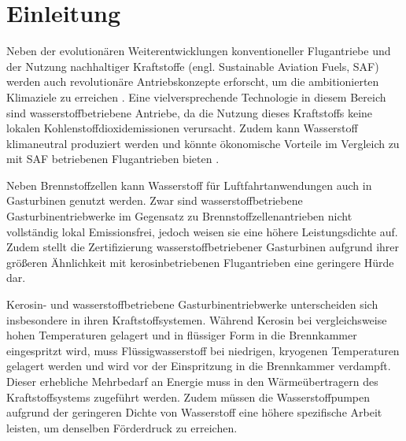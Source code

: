 \chapter{Einleitung}\label{chap:einleitung}



Neben der evolutionären Weiterentwicklungen konventioneller Flugantriebe und der Nutzung nachhaltiger Kraftstoffe (engl. Sustainable Aviation Fuels, SAF) werden auch revolutionäre Antriebskonzepte erforscht, um die ambitionierten Klimaziele zu erreichen \cite{cleanskies, EuropeanCommission2011}. Eine vielversprechende Technologie in diesem Bereich sind wasserstoffbetriebene Antriebe, da die Nutzung dieses Kraftstoffs keine lokalen Kohlenstoffdioxidemissionen verursacht. Zudem kann Wasserstoff klimaneutral produziert werden und könnte  ökonomische Vorteile im Vergleich zu mit SAF betriebenen Flugantrieben bieten \cite{VanLandingham}.

Neben Brennstoffzellen kann Wasserstoff für Luftfahrtanwendungen auch in Gasturbinen genutzt werden. Zwar sind wasserstoffbetriebene Gasturbinentriebwerke im Gegensatz zu Brennstoffzellenantrieben nicht vollständig lokal Emissionsfrei, jedoch weisen sie eine höhere Leistungsdichte auf. Zudem stellt die Zertifizierung wasserstoffbetriebener Gasturbinen aufgrund ihrer größeren Ähnlichkeit mit kerosinbetriebenen Flugantrieben eine geringere Hürde dar. \cite{Kadyk.2018}

Kerosin- und wasserstoffbetriebene Gasturbinentriebwerke unterscheiden sich insbesondere in ihren Kraftstoffsystemen. Während Kerosin bei vergleichsweise hohen Temperaturen gelagert und in flüssiger Form in die Brennkammer eingespritzt wird, muss Flüssigwasserstoff bei niedrigen, kryogenen Temperaturen gelagert werden und wird vor der Einspritzung in die Brennkammer verdampft. Dieser erhebliche Mehrbedarf an Energie muss in den Wärmeübertragern des Kraftstoffsystems zugeführt werden. Zudem müssen die Wasserstoffpumpen aufgrund der geringeren Dichte von Wasserstoff eine höhere spezifische Arbeit leisten, um denselben Förderdruck zu erreichen. 

